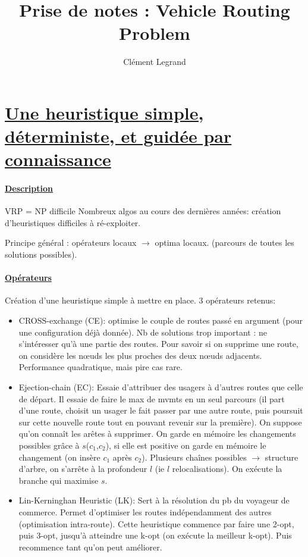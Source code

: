 \documentclass[a4paper,11pt]{report}%
\begin{document}
 

\title{Prise de notes : Vehicle Routing Problem} 
\author{Clément Legrand} 
\date{} 

\maketitle


\section*{\underline{Une heuristique simple, déterministe, et guidée par connaissance}}

\paragraph{\underline{Description}}

VRP = NP difficile
Nombreux algos au cours des dernières années: création d'heuristiques difficiles à ré-exploiter. 

Principe général : opérateurs locaux $\rightarrow$ optima locaux. 
(parcours de toutes les solutions possibles).

\paragraph{\underline{Opérateurs}}

Création d'une heuristique simple à mettre en place. 3 opérateurs retenus:
\begin{itemize}
\item CROSS-exchange (CE): optimise le couple de routes passé en argument (pour une configuration déjà donnée). Nb de solutions trop important : ne s'intéresser qu'à une partie des routes. Pour savoir si on supprime une route, on considère les n\oe uds les plus proches des deux n\oe uds adjacents.
Performance quadratique, mais pire cas rare.

\item Ejection-chain (EC): Essaie d'attribuer des usagers à d'autres routes que celle de départ. Il essaie de faire le max de mvmts en un seul parcours (il part d'une route, choisit un usager le fait passer par une autre route, puis poursuit sur cette nouvelle route tout en pouvant revenir sur la première). On suppose qu'on connaît les arêtes à supprimer. On garde en mémoire les changements possibles grâce à $s$($c_1$,$c_2$), si elle est positive on garde en mémoire le changement (on insère $c_1$ après $c_2$). Plusieurs chaînes possibles $\rightarrow$ structure d'arbre, on s’arrête à la profondeur $l$ (ie $l$ relocalisations). On exécute la branche qui maximise $s$. 

\item Lin-Kerninghan Heuristic (LK): Sert à  la résolution du pb du voyageur de commerce. Permet d'optimiser les routes indépendamment des autres (optimisation intra-route). Cette heuristique commence par faire une 2-opt, puis 3-opt, jusqu'à atteindre une k-opt (on exécute la meilleur k-opt). Puis recommence tant qu'on peut améliorer.

\end{itemize}
\end{document}
